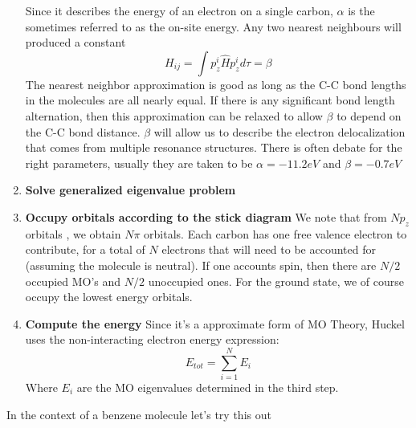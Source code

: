 \begin{enumerate}
\begin{equation}
    \end{equation}
    Since it describes the energy of an electron on a single carbon, $\alpha$ is the sometimes referred to as the on-site energy. Any two nearest neighbours will produced a constant 
    \begin{equation}
        H_{ij} = \int p_{z}^{i} \hat{H} p_{z}^{i} d\tau  = \beta
    \end{equation}
    The nearest neighbor approximation is good as long as the C-C bond lengths in the molecules are all nearly equal. If there is any significant bond length alternation, then this approximation can be relaxed to allow $\beta$ to depend on the C-C bond distance. $\beta$ will allow us to describe the electron delocalization that comes from multiple resonance structures. There is often debate for the right parameters, usually they are taken to be $\alpha =-11.2 \si{eV}$ and $\beta = -0.7 \si{eV}$
    \item \textbf{Solve generalized eigenvalue problem} 
    \item \textbf{Occupy orbitals according to the stick diagram} We note that from $N p_{z}$ orbitals , we obtain $N \pi$ orbitals. Each carbon has one free valence electron to contribute, for a total of $N$ electrons that will need to be accounted for (assuming the molecule is neutral). If one accounts spin, then there are $N/2$ occupied MO's and $N/2$ unoccupied ones. For the ground state, we of course occupy the lowest energy orbitals.
    \item \textbf{Compute the energy} Since it's a approximate form of MO Theory, Huckel uses the non-interacting electron energy expression:
    \begin{equation}
        E_{tot} = \sum_{i=1}^{N} E_{i}
    \end{equation}
    Where $E_{i}$ are the MO eigenvalues determined in the third step.
\end{enumerate}
In the context of a benzene molecule let's try this out \newline
